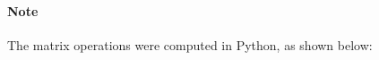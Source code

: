 \documentclass[]{article}
\begin{document}
\paragraph{Note}The matrix operations were computed in Python, as shown below:
\end{document}
